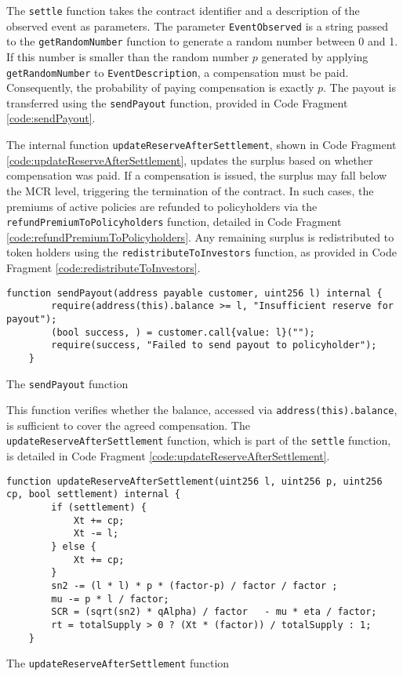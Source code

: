 \documentclass[10pt]{article}
\begin{document}
The \texttt{settle} function takes the contract identifier and a description of the observed event as parameters. The parameter \texttt{EventObserved} is a string passed to the \texttt{getRandomNumber} function to generate a random number between 0 and 1. If this number is smaller than the random number \(p\) generated by applying \texttt{getRandomNumber} to \texttt{EventDescription}, a compensation must be paid. Consequently, the probability of paying compensation is exactly \(p\). The payout is transferred using the \texttt{sendPayout} function, provided in Code Fragment \ref{code:sendPayout}.

The internal function \texttt{updateReserveAfterSettlement}, shown in Code Fragment \ref{code:updateReserveAfterSettlement}, updates the surplus based on whether compensation was paid. If a compensation is issued, the surplus may fall below the MCR level, triggering the termination of the contract. In such cases, the premiums of active policies are refunded to policyholders via the \texttt{refundPremiumToPolicyholders} function, detailed in Code Fragment \ref{code:refundPremiumToPolicyholders}. Any remaining surplus is redistributed to token holders using the \texttt{redistributeToInvestors} function, as provided in Code Fragment \ref{code:redistributeToInvestors}.

\begin{codefragment}[!h]
\begin{lstlisting}[language=Solidity]
function sendPayout(address payable customer, uint256 l) internal {
        require(address(this).balance >= l, "Insufficient reserve for payout");
        (bool success, ) = customer.call{value: l}("");
        require(success, "Failed to send payout to policyholder");
    }
\end{lstlisting}
    \caption{The \texttt{sendPayout} function}
    \label{code:sendPayout}
\end{codefragment}

This function verifies whether the balance, accessed via \texttt{address(this).balance}, is sufficient to cover the agreed compensation. The \texttt{updateReserveAfterSettlement} function, which is part of the \texttt{settle} function, is detailed in Code Fragment \ref{code:updateReserveAfterSettlement}.

\begin{codefragment}[!h]
\begin{lstlisting}[language=Solidity]
function updateReserveAfterSettlement(uint256 l, uint256 p, uint256 cp, bool settlement) internal {
        if (settlement) {
            Xt += cp;
            Xt -= l;
        } else {
            Xt += cp;
        }
        sn2 -= (l * l) * p * (factor-p) / factor / factor ;
        mu -= p * l / factor;
        SCR = (sqrt(sn2) * qAlpha) / factor   - mu * eta / factor;
        rt = totalSupply > 0 ? (Xt * (factor)) / totalSupply : 1;
    }
\end{lstlisting}
    \caption{The \texttt{updateReserveAfterSettlement} function}
    \label{code:updateReserveAfterSettlement}
\end{codefragment}
\end{document}
